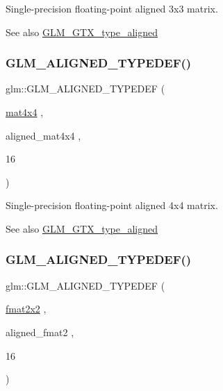 Single-\/precision floating-\/point aligned 3x3 matrix. \begin{DoxySeeAlso}{See also}
\mbox{\hyperlink{group__gtx__type__aligned}{G\+L\+M\+\_\+\+G\+T\+X\+\_\+type\+\_\+aligned}} 
\end{DoxySeeAlso}
\mbox{\label{group__gtx__type__aligned_gabe8c745fa2ced44a600a6e3f19991161}} 
\subsubsection{\texorpdfstring{GLM\_ALIGNED\_TYPEDEF()}{GLM\_ALIGNED\_TYPEDEF()}\hspace{0.1cm}{\footnotesize\ttfamily [168/209]}}
{\footnotesize\ttfamily glm\+::\+G\+L\+M\+\_\+\+A\+L\+I\+G\+N\+E\+D\+\_\+\+T\+Y\+P\+E\+D\+EF (\begin{DoxyParamCaption}\item[{\mbox{\hyperlink{group__core__types_ga63e3ee9447ed593484140a9368e738ec}{mat4x4}}}]{,  }\item[{aligned\+\_\+mat4x4}]{,  }\item[{16}]{ }\end{DoxyParamCaption})}

Single-\/precision floating-\/point aligned 4x4 matrix. \begin{DoxySeeAlso}{See also}
\mbox{\hyperlink{group__gtx__type__aligned}{G\+L\+M\+\_\+\+G\+T\+X\+\_\+type\+\_\+aligned}} 
\end{DoxySeeAlso}
\mbox{\label{group__gtx__type__aligned_ga719da577361541a4c43a2dd1d0e361e1}} 
\subsubsection{\texorpdfstring{GLM\_ALIGNED\_TYPEDEF()}{GLM\_ALIGNED\_TYPEDEF()}\hspace{0.1cm}{\footnotesize\ttfamily [169/209]}}
{\footnotesize\ttfamily glm\+::\+G\+L\+M\+\_\+\+A\+L\+I\+G\+N\+E\+D\+\_\+\+T\+Y\+P\+E\+D\+EF (\begin{DoxyParamCaption}\item[{\mbox{\hyperlink{group__gtc__type__precision_ga20fdbcc6b16bed27ad25db9b71d09e93}{fmat2x2}}}]{,  }\item[{aligned\+\_\+fmat2}]{,  }\item[{16}]{ }\end{DoxyParamCaption})}


